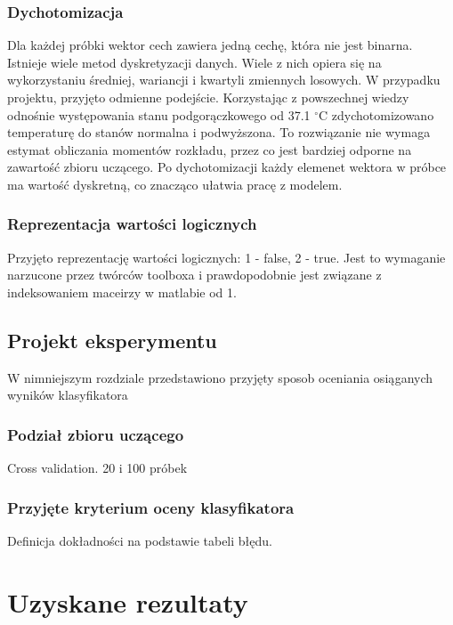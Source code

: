 \documentclass{article}
\begin{document}
\subsubsection{Dychotomizacja}
Dla każdej próbki wektor cech zawiera jedną cechę, która nie jest binarna. Istnieje wiele metod dyskretyzacji danych. Wiele z nich opiera się na wykorzystaniu średniej, wariancji i kwartyli zmiennych losowych. W przypadku projektu, przyjęto odmienne podejście. Korzystając z powszechnej wiedzy odnośnie występowania stanu podgorączkowego od 37.1 $^{\circ}$C zdychotomizowano temperaturę do stanów normalna i podwyższona. To rozwiązanie nie wymaga estymat obliczania momentów rozkładu, przez co jest bardziej odporne na zawartość zbioru uczącego. Po dychotomizacji każdy elemenet wektora w próbce ma wartość dyskretną, co znacząco ułatwia pracę z modelem.

\subsubsection{Reprezentacja wartości logicznych}
Przyjęto reprezentację wartości logicznych: 1 - false, 2 - true. Jest to wymaganie narzucone przez twórców toolboxa i prawdopodobnie jest związane z indeksowaniem maceirzy w matlabie od 1. 

\subsection{Projekt eksperymentu}
W nimniejszym rozdziale przedstawiono przyjęty sposob oceniania osiąganych wyników klasyfikatora

\subsubsection{Podział zbioru uczącego}
Cross validation. 20 i 100 próbek

\subsubsection{Przyjęte kryterium oceny klasyfikatora}
Definicja dokładności na podstawie tabeli błędu.

\section{Uzyskane rezultaty}
\end{document}
